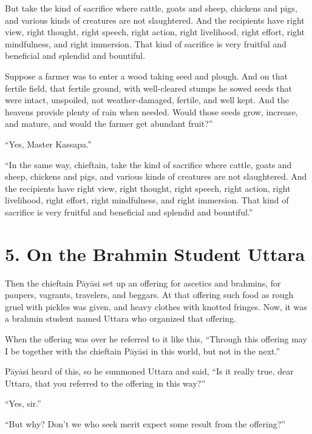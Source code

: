 \documentclass[12pt,openany]{book}%
\begin{document}
But take the kind of sacrifice where cattle, goats and sheep, chickens and pigs, and various kinds of creatures are not slaughtered. And the recipients have right view, right thought, right speech, right action, right livelihood, right effort, right mindfulness, and right immersion. That kind of sacrifice is very fruitful and beneficial and splendid and bountiful. 

Suppose a farmer was to enter a wood taking seed and plough. And on that fertile field, that fertile ground, with well-cleared stumps he sowed seeds that were intact, unspoiled, not weather-damaged, fertile, and well kept. And the heavens provide plenty of rain when needed. Would those seeds grow, increase, and mature, and would the farmer get abundant fruit?” 

“Yes, Master Kassapa.” 

“In the same way, chieftain, take the kind of sacrifice where cattle, goats and sheep, chickens and pigs, and various kinds of creatures are not slaughtered. And the recipients have right view, right thought, right speech, right action, right livelihood, right effort, right mindfulness, and right immersion. That kind of sacrifice is very fruitful and beneficial and splendid and bountiful.” 

\section*{5. On the Brahmin Student Uttara }

Then the chieftain \textsanskrit{Pāyāsi} set up an offering for ascetics and brahmins, for paupers, vagrants, travelers, and beggars. At that offering such food as rough gruel with pickles was given, and heavy clothes with knotted fringes. Now, it was a brahmin student named Uttara who organized that offering. 

When the offering was over he referred to it like this, “Through this offering may I be together with the chieftain \textsanskrit{Pāyāsi} in this world, but not in the next.” 

\textsanskrit{Pāyāsi} heard of this, so he summoned Uttara and said, “Is it really true, dear Uttara, that you referred to the offering in this way?” 

“Yes, sir.” 

“But why? Don’t we who seek merit expect some result from the offering?” 
\end{document}
